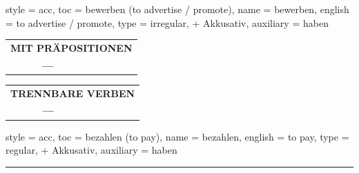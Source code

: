 \begin{verbentry}{
  style = {acc},
  toc = {bewerben (to advertise / promote)},
  name = {bewerben},
  english = {to advertise / promote},
  type = {irregular, + Akkusativ},
  auxiliary = {haben}
}
\vspace{10pt}

\begin{tabular}{lll}
\multicolumn{3}{l}{\textbf{MIT PRÄPOSITIONEN}}\\
& \textbf{---} & \\
\end{tabular}
\hfill
\begin{tabular}{lll}
\multicolumn{3}{l}{\textbf{TRENNBARE VERBEN}}\\
& \textbf{---} & \\
\end{tabular}

\vspace{-5pt}
\end{verbentry}

\begin{verbentry}{
  style = {acc},
  toc = {bezahlen (to pay)},
  name = {bezahlen},
  english = {to pay},
  type = {regular, + Akkusativ},
  auxiliary = {haben}
}
 
    
     \vspace{5pt}

    \hrule
    
    \vspace{5pt}


\end{verbentry}
